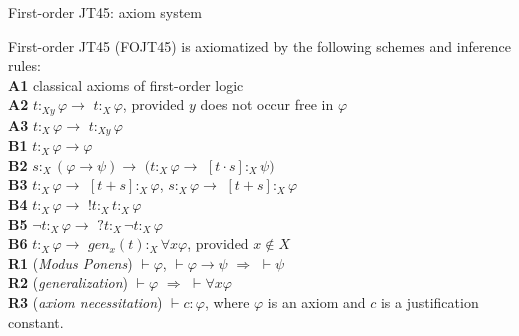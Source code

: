 \documentclass{beamer}
\theoremstyle{definition}
\newcommand{\nao}{\neg}
\newcommand{\impli}{\rightarrow}
\newcommand{\todo}{\forall}
\newcommand{\teo}{\vdash}
\begin{document}
	
\begin{frame}{First-order JT45: axiom system}

\qquad First-order JT45 (FOJT45) is axiomatized by the following schemes and inference rules:\\
 \vspace{5 mm}	
		\textbf{A1} classical axioms of first-order logic\\
		\textbf{A2} $t$$:_{Xy}$$\varphi \impli$ $t$$:_{X}$$\varphi$, provided $y$ does not occur free in $\varphi$\\
		
		\textbf{A3} $t$$:_{X}$$\varphi \impli$ $t$$:_{Xy}$$\varphi$ \\
		
		\textbf{B1} $t$$:_{X}$$\varphi \impli \varphi$\\
		
		\textbf{B2} $s$$:_{X}$$(\varphi \impli \psi) \impli$ $(t$$:_{X}$$\varphi \impli$ $[t\cdot s]$$:_{X}$$\psi)$\\
		
		\textbf{B3} $t$$:_{X}$$\varphi \impli$ $[t+s]$$:_{X}$$\varphi$, $s$$:_{X}$$\varphi \impli$ $[t+s]$$:_{X}$$\varphi$\\ 
		
		\textbf{B4} $t$$:_{X}$$\varphi \impli$ $!t$$:_{X}$$t$$:_{X}$$\varphi$\\
		
		
	{\color{blue} 	\textbf{B5} $\nao t$$:_{X}$$\varphi \impli$ $?t$$:_{X}$$\nao t$$:_{X}$$\varphi$}\\
		
		
		\textbf{B6} $t$$:_{X}$$\varphi \impli$ $gen_{x}(t)$$:_{X}$$ \todo x \varphi$, provided $x \notin X$\\
		
		
		\textbf{R1} (\textit{Modus Ponens}) $\teo \varphi$, $\teo \varphi\impli\psi$ $\Rightarrow$ $\teo \psi$ \\
		
		\textbf{R2} (\textit{generalization})  $\teo \varphi$ $\Rightarrow$ $\teo \todo x \varphi$ \\
		
		\textbf{R3} (\textit{axiom necessitation})  $\teo c$$:$$\varphi$, where $\varphi$ is an axiom and $c$ is a justification constant.\\	
\end{frame}	
	
\end{document}
